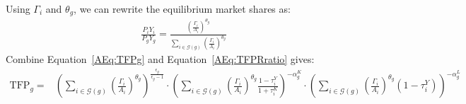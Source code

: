 \documentclass[12pt]{article}
\begin{document}
Using $\Gamma_i$ and $\theta_g$, we can rewrite the equilibrium market shares as:
\begin{align}
\frac{P_iY_i}{P_gY_g} = \frac{\left( \frac{\Gamma_i}{A_i} \right)^{\theta_g}}{\sum_{i \in \mathcal{G}(g)}\left( \frac{\Gamma_i}{A_i} \right)^{\theta_g}} \label{AEq:marketShares}
\end{align}
Combine Equation~\eqref{AEq:TFPg} and Equation~\eqref{AEq:TFPRratio} gives:
\begin{align}
\text{TFP}_g=&\left( \sum_{i\in\mathcal{G}(g)}\left( \frac{\Gamma_i}{A_i} \right)^{\theta_g} \right)^{\frac{\epsilon_g}{\epsilon_g-1}} \cdot \left( \sum_{i\in\mathcal{G}(g)}\left( \frac{\Gamma_i}{A_i} \right)^{\theta_g} \frac{1-\tau_i^Y}{1+\tau_i^K}\right)^{-\alpha_g^K} \cdot \left( \sum_{i\in\mathcal{G}(g)}\left( \frac{\Gamma_i}{A_i} \right)^{\theta_g} (1-\tau_i^Y)\right)^{-\alpha_g^L}  \label{AEq:TFPg2}
\end{align}
\end{document}
